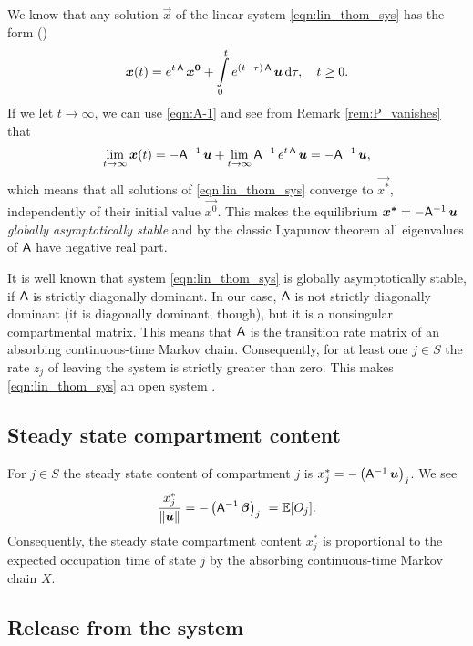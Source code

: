 \documentclass[smallextended]{svjour3}
\newcommand{\E}{\mathbb{E}}
\newcommand{\intl}{\int\limits}
\newcommand{\liml}{\lim\limits}
\begin{document}
We know that any solution $\vec{x}$ of the linear system \eqref{eqn:lin_thom_sys} has the form (\citet{Anderson1983})
\[
    \vec{x}(t) = e^{t\,\tens{A}}\,\vec{x^0} + \intl_0^t e^{(t-\tau)\,\tens{A}}\,\vec{u}\,\mathrm{d}\tau,\quad t\geq0.
\]
If we let $t\to\infty$, we can use \eqref{eqn:A-1} and see from Remark \ref{rem:P_vanishes} that
\begin{equation*}
    \liml_{t\to\infty} \vec{x}(t) = -\tens{A}^{-1}\,\vec{u} + \liml_{t\to\infty} \tens{A}^{-1}\,e^{t\,\tens{A}}\,\vec{u}\\
    = -\tens{A}^{-1}\,\vec{u},
\end{equation*}
which means that all solutions of \eqref{eqn:lin_thom_sys} converge to $\vec{x^\ast}$, independently of their initial value $\vec{x^0}$.
This makes the equilibrium $\vec{x^\ast}=-\tens{A}^{-1}\,\vec{u}$ \emph{globally asymptotically stable} and by the classic Lyapunov theorem \citep[Theorem 2.10]{Engel2000} all eigenvalues of $\mathsf{A}$ have negative real part.

It is well known that system \eqref{eqn:lin_thom_sys} is globally asymptotically stable, if $\mathsf{A}$ is strictly diagonally dominant.
In our case, $\mathsf{A}$ is not strictly diagonally dominant (it is diagonally dominant, though), but it is a nonsingular compartmental matrix.
This means that $\mathsf{A}$ is the transition rate matrix of an absorbing continuous-time Markov chain.
Consequently, for at least one $j\in S$ the rate $z_j$ of leaving the system is strictly greater than zero.
This makes \eqref{eqn:lin_thom_sys} an open system \citep{Jacquez1993SIAM}.

\subsection{Steady state compartment content}

For $j\in S$ the steady state content of compartment $j$ is $x^\ast_j=-\left(\tens{A}^{-1}\,\vec{u}\right)_j$.
We see
\begin{equation}\label{eqn:OT}
    \frac{x^\ast_j}{\|\vec{u}\|} = -\left(\tens{A}^{-1}\,\vec{\beta}\right)_j\ = \E[O_j].
\end{equation}
Consequently, the steady state compartment content $x_j^\ast$ is proportional to the expected occupation time of state $j$ by the absorbing continuous-time Markov chain $X$.

\subsection{Release from the system}
\end{document}

